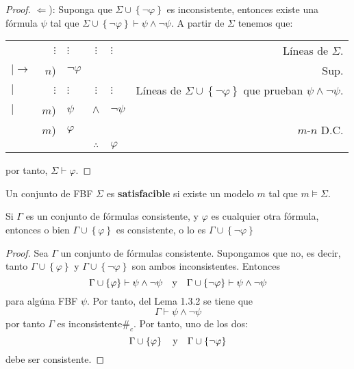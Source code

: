 \documentclass[12pt]{report}
\theoremstyle{largebreak}
\newcommand\contradiction{\ensuremath{\#_c}}
\begin{document}
\begin{proof}
        $\Leftarrow$): Suponga que $\Sigma\cup\left\{\neg\varphi\right\}$ es inconsistente, entonces existe una fórmula $\psi$ tal que $\Sigma\cup\left\{\neg\varphi\right\}\vdash\psi\land\neg\psi$. A partir de $\Sigma$ tenemos que:
        \begin{center}
            \begin{tabular}{l r l c l r}
                & $\vdots$ & $\vdots$ & $\vdots$ & $\vdots$ & Líneas de $\Sigma$. \\
                $|\longrightarrow$ & $n$) & $\neg\varphi$ &  &  & Sup. \\
                $|$ & $\vdots$ & $\vdots$ & $\vdots$ & $\vdots$ & Líneas de $\Sigma\cup\left\{\neg\varphi\right\}$ que prueban $\psi\land\neg\psi$.\\
                $|$ & $m$) & $\psi$ & $\land$ & $\neg\psi$ & \\
                \hline
                & $m$) & $\varphi$ &  &  & $m$-$n$ D.C. \\
                \hline
                & & & $\therefore$ & $\varphi$ & \\
            \end{tabular}
        \end{center}
        por tanto, $\Sigma\vdash\varphi$.
    \end{proof}

    \begin{mydef}
        Un conjunto de FBF $\Sigma$ es \textbf{satisfacible} si existe un modelo $m$ tal que $m\vDash\Sigma$.
    \end{mydef}

    \begin{lema}
        Si $\Gamma$ es un conjunto de fórmulas consistente, y $\varphi$ es cualquier otra fórmula, entonces o bien $\Gamma\cup\left\{\varphi\right\}$ es consistente, o lo es $\Gamma\cup\left\{\neg\varphi\right\}$
    \end{lema}

    \begin{proof}
        Sea $\Gamma$ un conjunto de fórmulas consistente. Supongamos que no, es decir, tanto $\Gamma\cup\left\{\varphi\right\}$ y $\Gamma\cup\left\{\neg\varphi\right\}$ son ambos inconsistentes. Entonces
        \begin{equation*}
            \Gamma\cup\left\{\varphi\right\}\vdash\psi\land\neg\psi\quad\textup{y}\quad\Gamma\cup\left\{\neg\varphi\right\}\vdash\psi\land\neg\psi
        \end{equation*}
        para algúna FBF $\psi$. Por tanto, del Lema 1.3.2 se tiene que
        \begin{equation*}
            \Gamma\vdash\psi\land\neg\psi
        \end{equation*}
        por tanto $\Gamma$ es inconsistente\contradiction. Por tanto, uno de los dos:
        \begin{equation*}
            \Gamma\cup\left\{\varphi\right\}\quad\textup{y}\quad\Gamma\cup\left\{\neg\varphi\right\}
        \end{equation*}
        debe ser consistente.
    \end{proof}
\end{document}
